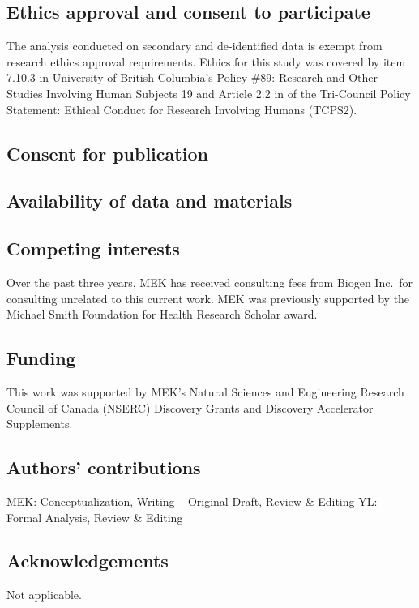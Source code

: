 \documentclass[sn-vancouver,Numbered,lineno,pdflatex]{sn-jnl}
\begin{document}
\subsection*{Ethics approval and consent to
participate}\label{ethics-approval-and-consent-to-participate}

The analysis conducted on secondary and de-identified data is exempt
from research ethics approval requirements. Ethics for this study was
covered by item 7.10.3 in University of British Columbia's Policy \#89:
Research and Other Studies Involving Human Subjects 19 and Article 2.2
in of the Tri-Council Policy Statement: Ethical Conduct for Research
Involving Humans (TCPS2).

\subsection*{Consent for publication}\label{consent-for-publication}

\subsection*{Availability of data and
materials}\label{availability-of-data-and-materials}

\subsection*{Competing interests}\label{competing-interests}

Over the past three years, MEK has received consulting fees from Biogen
Inc.~for consulting unrelated to this current work. MEK was previously
supported by the Michael Smith Foundation for Health Research Scholar
award.

\subsection*{Funding}\label{funding}

This work was supported by MEK's Natural Sciences and Engineering
Research Council of Canada (NSERC) Discovery Grants and Discovery
Accelerator Supplements.

\subsection*{Authors' contributions}\label{authors-contributions}

MEK: Conceptualization, Writing -- Original Draft, Review \& Editing YL:
Formal Analysis, Review \& Editing

\subsection*{Acknowledgements}\label{acknowledgements}

Not applicable.

\renewcommand\refname{References}

\end{document}
